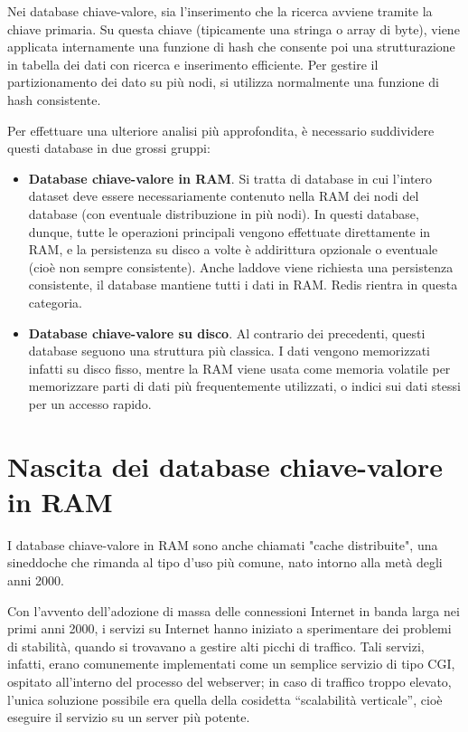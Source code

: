 Nei database chiave-valore, sia l'inserimento che la ricerca avviene tramite
la chiave primaria. Su questa chiave (tipicamente una stringa o array di byte),
viene applicata internamente una funzione di hash che consente poi una strutturazione
in tabella dei dati con ricerca e inserimento efficiente. Per gestire il partizionamento
dei dato su più nodi, si utilizza normalmente una funzione di hash consistente.

Per effettuare una ulteriore analisi più approfondita, è necessario suddividere
questi database in due grossi gruppi:

\begin{itemize}
	\medskip
	\item
	\textbf{Database chiave-valore in RAM}. Si tratta di database in cui l'intero dataset
	deve essere necessariamente contenuto nella RAM dei nodi del database
	(con eventuale distribuzione in più nodi). In questi database, dunque, tutte
	le operazioni principali vengono effettuate direttamente in RAM, e la persistenza
	su disco a volte è addirittura opzionale o eventuale (cioè non sempre consistente).
	Anche laddove viene richiesta una persistenza consistente, il database mantiene
	tutti i dati in RAM. Redis rientra in questa categoria.

	\item
	\textbf{Database chiave-valore su disco}. Al contrario dei precedenti, questi
	database seguono una struttura più classica. I dati vengono memorizzati infatti
	su disco fisso, mentre la RAM viene usata come memoria volatile per memorizzare
	parti di dati più frequentemente utilizzati, o indici sui dati stessi per un
	accesso rapido.
\end{itemize}

\section{Nascita dei database chiave-valore in RAM}

I database chiave-valore in RAM sono anche chiamati "cache distribuite", una sineddoche
che rimanda al tipo d'uso più comune, nato intorno alla metà degli anni 2000.

Con l'avvento dell'adozione di massa delle connessioni Internet in banda larga nei primi
anni 2000, i servizi su Internet hanno iniziato a sperimentare dei problemi di stabilità,
quando si trovavano a gestire alti picchi di traffico. Tali servizi, infatti, erano
comunemente implementati come un semplice servizio di tipo CGI, ospitato all'interno
del processo del webserver; in caso di traffico troppo elevato, l'unica soluzione possibile
era quella della cosidetta ``scalabilità verticale'', cioè eseguire il servizio su un
server più potente.

